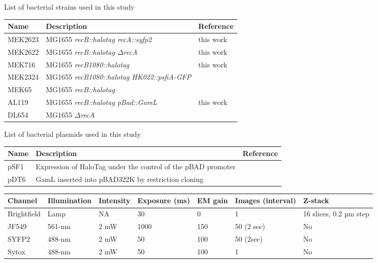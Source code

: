 
\begin{supptable}[htbp]
    \centering
    \caption{List of bacterial strains used in this study}
    \begin{tabular}{lll}
        \toprule
        Name & Description & Reference\\
        \midrule
        MEK2623 & MG1655 \textit{recB::halotag recA::syfp2} & this work\\
        MEK2622 & MG1655 \textit{recB::halotag $\Delta$recA} & this work \\ %
        MEK716 & MG1655 \textit{recB1080::halotag} & this work \\ %
        MEK2324 & MG1655 \textit{recB1080::halotag HK022::psfiA-GFP} & \cite{Lepore2023} \\
        MEK65 & MG1655 \textit{recB::halotag} & \cite{Lepore2019a} \\
        AL119 & MG1655 \textit{recB::halotag pBad::GamL} & this work \\ %
        DL654 & MG1655 \textit{$\Delta$recA} & \cite{Wertman1986} \\
        \bottomrule
    \end{tabular}
    \label{SItab:strains}
\end{supptable}

\begin{supptable}[htbp]
    \centering
    \caption{List of bacterial plasmids used in this study}
    \begin{tabular}{lll}
        \toprule
        Name & Description & Reference\\
        \midrule
        pSF1 & Expression of HaloTag under the control of the pBAD promoter & \cite{Lepore2019a} \\
        pDT6 & GamL inserted into pBAD322K by restriction cloning & \cite{Wilkinson2016} \\
        \bottomrule
    \end{tabular}
    \label{SItab:plasmids}
\end{supptable}

\begin{supptable}[htbp]
    \centering
    \caption{}
    \begin{tabular}{lllllll}
        \toprule
        Channel & Illumination & Intensity & Exposure (ms) & EM gain & Images (interval) & Z-stack\\
        \midrule
        Brightfield & Lamp & NA & 30 & 0 & 1 & 16 slices, 0.2 µm step\\
        JF549 & 561-nm & 2 mW & 1000 & 150 & 50 (2 sec) & No\\
        SYFP2 & 488-nm & 2 mW & 50 & 100 & 50 (2sec) & No\\
        Sytox & 488-nm & 2 mW & 50 & 100 & 1 & No\\
        \bottomrule
    \end{tabular}
    \label{SItab:acquisition_channels}
\end{supptable}

